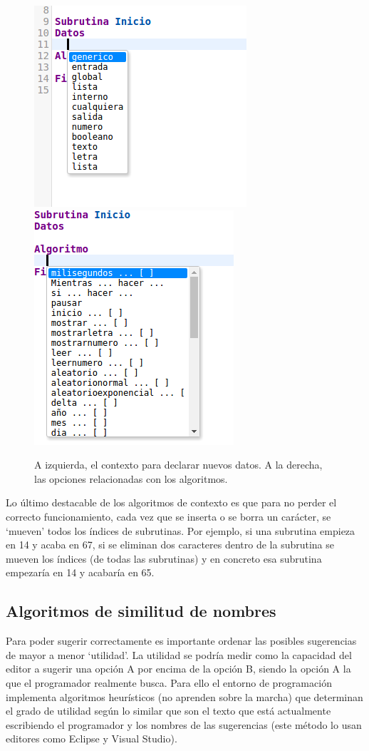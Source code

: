 \documentclass{report}
\begin{document}
\begin{figure}
\centering
	\includegraphics[width=0.45\linewidth]{autocompletado2}
	\includegraphics[width=0.35\linewidth]{autocompletado3}
\caption[Ejemplos de distintos contextos en autocompletado.]{A izquierda, el contexto para declarar nuevos datos. A la derecha, las opciones relacionadas con los algoritmos.}
\label{fig:autocompletado}
\end{figure}
	
	\vspace{10px}
	
	Lo último destacable de los algoritmos de contexto es que para no perder el correcto funcionamiento, cada vez que se inserta o se borra un carácter, se `mueven' todos los índices de subrutinas. Por ejemplo, si una subrutina empieza en 14 y acaba en 67, si se eliminan dos caracteres dentro de la subrutina se mueven los índices (de todas las subrutinas) y en concreto esa subrutina empezaría en 14 y acabaría en 65.
			
	\subsection{Algoritmos de similitud de nombres}
	
	Para poder sugerir correctamente es importante ordenar las posibles sugerencias de mayor a menor `utilidad'. La utilidad se podría medir como la capacidad del editor a sugerir una opción A por encima de la opción B, siendo la opción A la que el programador realmente busca. Para ello el entorno de programación implementa algoritmos heurísticos (no aprenden sobre la marcha) que determinan el grado de utilidad según lo similar que son el texto que está actualmente escribiendo el programador y los nombres de las sugerencias (este método lo usan editores como Eclipse y Visual Studio).
	
\end{document}
